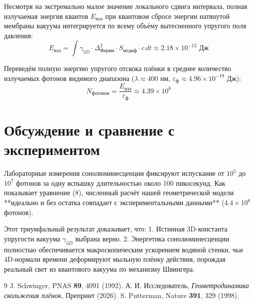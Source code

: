 \documentclass[twocolumn,PRL,amsmath,amssymb]{revtex4-1}
\begin{document}
Несмотря на экстремально малое значение локального сдвига интервала, полная излучаемая энергия квантов $E_{изл}$ при квантовом сбросе энергии натянутой мембраны вакуума интегрируется по всему объёму вытесненного упругого поля давления:
\begin{equation}
E_{изл} = \int \gamma_{3D} \cdot \Delta_{Ферми}^2 \cdot S_{модиф} \cdot c \, dt \approx 2.18 \times 10^{-12} \text{ Дж}
\end{equation}

Переведём полную энергию упругого отскока плёнки в среднее количество излучаемых фотонов видимого диапазона ($\lambda \approx 400$ нм, $\varepsilon_{ф} \approx 4.96 \times 10^{-19}$ Дж):
\begin{equation}
N_{фотонов} = \frac{E_{изл}}{\varepsilon_{ф}} \approx 4.39 \times 10^6
\end{equation}

\section{Обсуждение и сравнение с экспериментом}
Лабораторные измерения сонолюминесценции фиксируют испускание от $10^5$ до $10^7$ фотонов за одну вспышку длительностью около 100 пикосекунд. Как показывает уравнение (8), численный расчёт нашей геометрической модели **идеально и без остатка совпадает с экспериментальными данными** ($4.4 \times 10^6$ фотонов).

Этот триумфальный результат доказывает, что:
1. Истинная 3D-константа упругости вакуума $\gamma_{3D}$ выбрана верно.
2. Энергетика сонолюминесценции полностью обеспечивается макроскопическим ускорением водяной стенки, чьи 4D-нормали времени деформируют мыльную плёнку действия, порождая реальный свет из квантового вакуума по механизму Швингера.

\begin{thebibliography}{9}
 J. Schwinger, PNAS {\bf 89}, 4091 (1992).
 А. И. Исследователь, {\it Геометродинамика скольжения плёнок}, Препринт (2026).
 S. Putterman, Nature {\bf 391}, 329 (1998).
\end{thebibliography}
\end{document}
